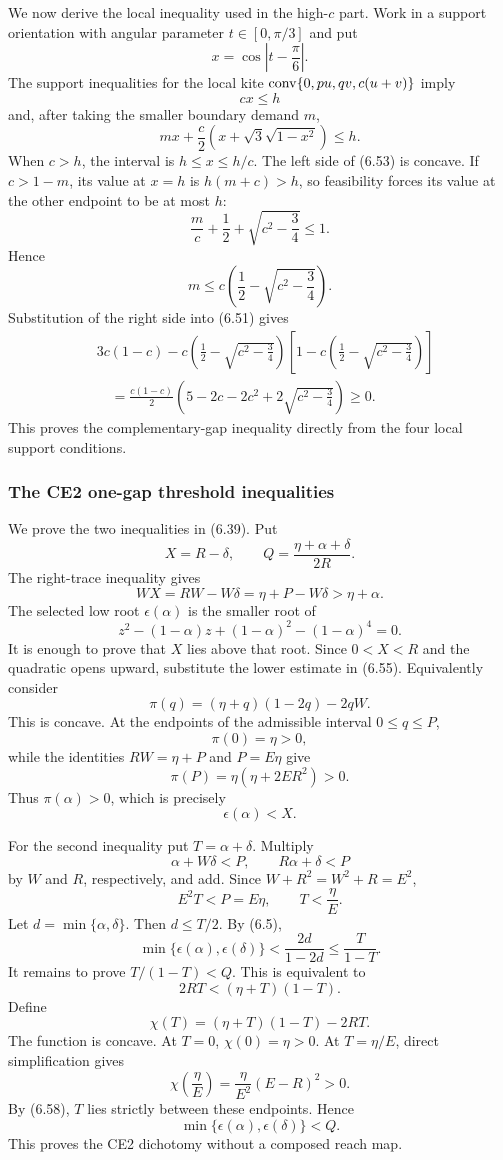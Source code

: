We now derive the local inequality used in the high-$c$ part.  Work in a
support orientation with angular parameter $t\in[0,\pi/3]$ and put
\[
 x=\cos\left|t-\frac\pi6\right|.
\]
The support inequalities for the local kite
$\mathrm{conv}\{0,pu,qv,c(u+v)\}$ imply
\[
 cx\le h
 \tag{6.52}
\]
and, after taking the smaller boundary demand $m$,
\[
 mx+\frac c2
 \left(x+\sqrt3\sqrt{1-x^2}\right)\le h.
 \tag{6.53}
\]
When $c>h$, the interval is $h\le x\le h/c$.  The left side of (6.53) is
concave.  If $c>1-m$, its value at $x=h$ is $h(m+c)>h$, so feasibility forces
its value at the other endpoint to be at most $h$:
\[
 \frac mc+\frac12+\sqrt{c^2-\frac34}\le1.
\]
Hence
\[
 m\le c\left(\frac12-\sqrt{c^2-\frac34}\right).
 \tag{6.54}
\]
Substitution of the right side into (6.51) gives
\[
\begin{aligned}
&3c(1-c)-
 c\left(\frac12-\sqrt{c^2-\frac34}\right)
 \left[1-c\left(\frac12-\sqrt{c^2-\frac34}\right)\right]\\
&\quad=
\frac{c(1-c)}2
\left(5-2c-2c^2+2\sqrt{c^2-\frac34}\right)\ge0.
\end{aligned}
\]
This proves the complementary-gap inequality directly from the four local
support conditions.

\subsubsection{The CE2 one-gap threshold inequalities}
\label{subsec:calc-ce2-one-gap-threshold}

We prove the two inequalities in (6.39).  Put
\[
 X=R-\delta,
 \qquad
 Q=\frac{\eta+\alpha+\delta}{2R}.
\]
The right-trace inequality gives
\[
 WX=RW-W\delta=\eta+P-W\delta>\eta+\alpha.
 \tag{6.55}
\]
The selected low root $\epsilon(\alpha)$ is the smaller root of
\[
 z^2-(1-\alpha)z+(1-\alpha)^2-(1-\alpha)^4=0.
 \tag{6.56}
\]
It is enough to prove that $X$ lies above that root.  Since
$0<X<R$ and the quadratic opens upward, substitute the lower estimate in
(6.55).  Equivalently consider
\[
 \pi(q)=(\eta+q)(1-2q)-2qW.
\]
This is concave.  At the endpoints of the admissible interval $0\le q\le P$,
\[
 \pi(0)=\eta>0,
\]
while the identities $RW=\eta+P$ and $P=E\eta$ give
\[
 \pi(P)=\eta(\eta+2ER^2)>0.
\]
Thus $\pi(\alpha)>0$, which is precisely
\[
 \epsilon(\alpha)<X.
 \tag{6.57}
\]

For the second inequality put $T=\alpha+\delta$.  Multiply
\[
 \alpha+W\delta<P,
 \qquad
 R\alpha+\delta<P
\]
by $W$ and $R$, respectively, and add.  Since
$W+R^2=W^2+R=E^2$,
\[
 E^2T<P=E\eta,
 \qquad
 T<\frac\eta E.
 \tag{6.58}
\]
Let $d=\min\{\alpha,\delta\}$.  Then $d\le T/2$.  By (6.5),
\[
 \min\{\epsilon(\alpha),\epsilon(\delta)\}
 <\frac{2d}{1-2d}
 \le\frac{T}{1-T}.
\]
It remains to prove $T/(1-T)<Q$.  This is equivalent to
\[
 2RT<(\eta+T)(1-T).
\]
Define
\[
 \chi(T)=(\eta+T)(1-T)-2RT.
\]
The function is concave.  At $T=0$, $\chi(0)=\eta>0$.  At
$T=\eta/E$, direct simplification gives
\[
 \chi\left(\frac\eta E\right)
 =\frac{\eta}{E^2}(E-R)^2>0.
\]
By (6.58), $T$ lies strictly between these endpoints.  Hence
\[
 \boxed{
 \min\{\epsilon(\alpha),\epsilon(\delta)\}<Q.
 }
 \tag{6.59}
\]
This proves the CE2 dichotomy without a composed reach map.


